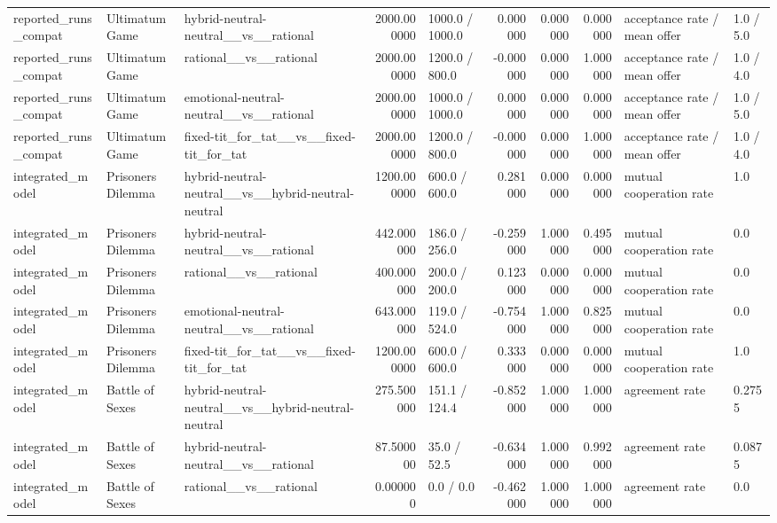 \begin{tabular}{lllrlrrrll}
reported\_runs\_compat & Ultimatum Game & hybrid-neutral-neutral\_\_vs\_\_rational & 2000.000000 & 1000.0 / 1000.0 & 0.000000 & 0.000000 & 0.000000 & acceptance rate / mean offer & 1.0 / 5.0 \\
reported\_runs\_compat & Ultimatum Game & rational\_\_vs\_\_rational & 2000.000000 & 1200.0 / 800.0 & -0.000000 & 0.000000 & 1.000000 & acceptance rate / mean offer & 1.0 / 4.0 \\
reported\_runs\_compat & Ultimatum Game & emotional-neutral-neutral\_\_vs\_\_rational & 2000.000000 & 1000.0 / 1000.0 & 0.000000 & 0.000000 & 0.000000 & acceptance rate / mean offer & 1.0 / 5.0 \\
reported\_runs\_compat & Ultimatum Game & fixed-tit\_for\_tat\_\_vs\_\_fixed-tit\_for\_tat & 2000.000000 & 1200.0 / 800.0 & -0.000000 & 0.000000 & 1.000000 & acceptance rate / mean offer & 1.0 / 4.0 \\
integrated\_model & Prisoners Dilemma & hybrid-neutral-neutral\_\_vs\_\_hybrid-neutral-neutral & 1200.000000 & 600.0 / 600.0 & 0.281000 & 0.000000 & 0.000000 & mutual cooperation rate & 1.0 \\
integrated\_model & Prisoners Dilemma & hybrid-neutral-neutral\_\_vs\_\_rational & 442.000000 & 186.0 / 256.0 & -0.259000 & 1.000000 & 0.495000 & mutual cooperation rate & 0.0 \\
integrated\_model & Prisoners Dilemma & rational\_\_vs\_\_rational & 400.000000 & 200.0 / 200.0 & 0.123000 & 0.000000 & 0.000000 & mutual cooperation rate & 0.0 \\
integrated\_model & Prisoners Dilemma & emotional-neutral-neutral\_\_vs\_\_rational & 643.000000 & 119.0 / 524.0 & -0.754000 & 1.000000 & 0.825000 & mutual cooperation rate & 0.0 \\
integrated\_model & Prisoners Dilemma & fixed-tit\_for\_tat\_\_vs\_\_fixed-tit\_for\_tat & 1200.000000 & 600.0 / 600.0 & 0.333000 & 0.000000 & 0.000000 & mutual cooperation rate & 1.0 \\
integrated\_model & Battle of Sexes & hybrid-neutral-neutral\_\_vs\_\_hybrid-neutral-neutral & 275.500000 & 151.1 / 124.4 & -0.852000 & 1.000000 & 1.000000 & agreement rate & 0.2755 \\
integrated\_model & Battle of Sexes & hybrid-neutral-neutral\_\_vs\_\_rational & 87.500000 & 35.0 / 52.5 & -0.634000 & 1.000000 & 0.992000 & agreement rate & 0.0875 \\
integrated\_model & Battle of Sexes & rational\_\_vs\_\_rational & 0.000000 & 0.0 / 0.0 & -0.462000 & 1.000000 & 1.000000 & agreement rate & 0.0 \\

\end{tabular}
